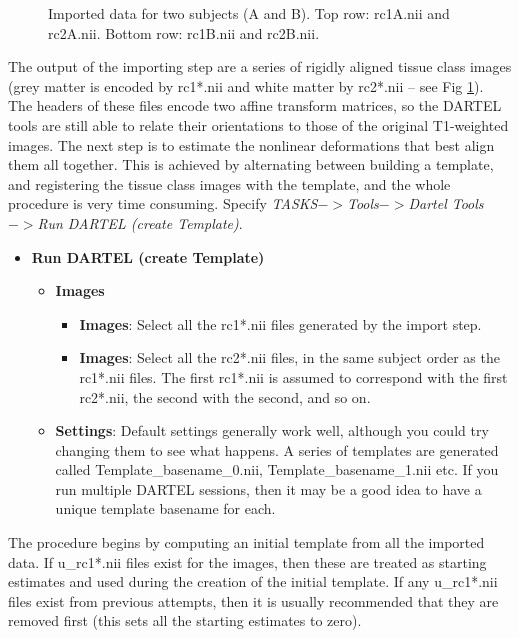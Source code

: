 \begin{figure}
\begin{center}
\end{center}
\caption{
Imported data for two subjects (A and B).
Top row: rc1A.nii and rc2A.nii.
Bottom row: rc1B.nii and rc2B.nii.
\label{Fig:imported}}
\end{figure}

The output of the importing step are a series of rigidly aligned tissue class images (grey matter is encoded by rc1*.nii and white matter by rc2*.nii -- see Fig \ref{Fig:imported}).
The headers of these files encode two affine transform matrices, so the DARTEL tools are still able to relate their orientations to those of the original T1-weighted images.
The next step is to estimate the nonlinear deformations that best align them all together.
This is achieved by alternating between building a template, and registering the tissue class images with the template, and the whole procedure is very time consuming.
Specify \emph{TASKS$->$Tools$->$Dartel Tools$->$Run DARTEL (create Template)}.
\begin{itemize}
\item{{\bf Run DARTEL (create Template)}
  \begin{itemize}
  \item{{\bf Images}
    \begin{itemize}
    \item{{\bf Images}: Select all the rc1*.nii files generated by the import step.
    }
    \item{{\bf Images}: Select all the rc2*.nii files, in the same subject order as the rc1*.nii files. The first rc1*.nii is assumed to correspond with the first rc2*.nii, the second with the second, and so on.
    }
    \end{itemize}
  }
  \item{{\bf Settings}: Default settings generally work well, although you could try changing them to see what happens. A series of templates are generated called Template\_basename\_0.nii, Template\_basename\_1.nii etc.  If you run multiple DARTEL sessions, then it may be a good idea to have a unique template basename for each. 
  }
  \end{itemize}
}
\end{itemize}
The procedure begins by computing an initial template from all the imported data.
If u\_rc1*.nii files exist for the images, then these are treated as starting estimates and used during the creation of the initial template.  If any u\_rc1*.nii files exist from previous attempts, then it is usually recommended that they are removed first (this sets all the starting estimates to zero).
